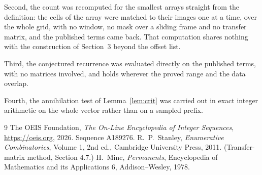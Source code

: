 \documentclass[11pt,a4paper]{article}
\theoremstyle{plain}
\theoremstyle{definition}
\begin{document}
Second, the count was recomputed for the smallest arrays straight from the definition: the
cells of the array were matched to their images one at a time, over the whole grid, with no
window, no mask over a sliding frame and no transfer matrix, and the published terms came back.
That computation shares nothing with the construction of Section~3 beyond the offset list.

Third, the conjectured recurrence was evaluated directly on the published terms, with no
matrices involved, and holds wherever the proved range and the data overlap.

Fourth, the annihilation test of Lemma~\ref{lem:crit} was carried out in exact integer
arithmetic on the whole vector rather than on a sampled prefix.

\begin{thebibliography}{9}
 The OEIS Foundation, \emph{The On-Line Encyclopedia of Integer
Sequences}, \url{https://oeis.org}, 2026. Sequence A189276.
 R.~P.~Stanley, \emph{Enumerative Combinatorics}, Volume 1, 2nd ed.,
Cambridge University Press, 2011. (Transfer-matrix method, Section 4.7.)
 H.~Minc, \emph{Permanents}, Encyclopedia of Mathematics and its
Applications 6, Addison--Wesley, 1978.
\end{thebibliography}
\end{document}
